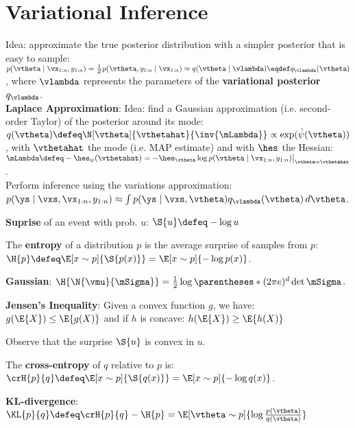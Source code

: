 \section{Variational Inference}
Idea: approximate the true posterior distribution with a simpler posterior that is easy to sample: \\$p(\vtheta \mid \vx_{1:n}, y_{1:n}) = \frac{1}{Z} p(\vtheta, y_{1:n} \mid \vx_{1:n}) \approx q(\vtheta \mid \vlambda) \eqdef q_\vlambda(\vtheta)$, where $\vlambda$ represents the parameters of the \textbf{variational posterior} $q_\vlambda$.\\
\textbf{Laplace Approximation}: Idea: find a Gaussian approximation (i.e. second-order Taylor) of the posterior around its mode:
$q(\vtheta) \defeq \N[\vtheta]{\vthetahat}{\inv{\mLambda}} \propto \exp(\hat{\psi}(\vtheta))$, with $\vthetahat$ the mode (i.e. MAP estimate) and with $\hes$ the Hessian: $\mLambda \defeq - \hes_\psi(\vthetahat) = - \hes_\vtheta \log p(\vtheta \mid \vx_{1:n}, y_{1:n}) \bigl|_{\vtheta = \vthetahat}$. \\
Perform inference using the variations approximation: $p(\ys \mid \vxs, \vx_{1:n}, y_{1:n})  \approx \int p(\ys \mid \vxs, \vtheta) q_\vlambda(\vtheta) \,d\vtheta$.
\begin{framed}
    \textbf{Suprise} of an event with prob. $u$: $\S{u} \defeq - \log u$
\end{framed}
\begin{framed}
    The \textbf{entropy} of a distribution $p$ is the average surprise of samples from $p$:\\
    $\H{p} \defeq \E[x \sim p]{\S{p(x)}} = \E[x \sim p]{- \log p(x)}$.
\end{framed}
\textbf{Gaussian}: $\H{\N{\vmu}{\mSigma}} = \frac{1}{2} \log \parentheses*{(2 \pi e)^d \det{\mSigma}}$.
\begin{framed}
    \textbf{Jensen's Inequality}: Given a convex function $g$, we have:
    $g(\E{X}) \leq \E{g(X)}$ and if $h$ is concave:  $h(\E{X}) \geq \E{h(X)}$
\end{framed}
Observe that the surprise $\S{u}$ is convex in $u$.
\begin{framed}
    The \textbf{cross-entropy} of $q$ relative to $p$ is: \\
    $\crH{p}{q} \defeq \E[x \sim p]{\S{q(x)}} = \E[x \sim p]{- \log q(x)}$.
\end{framed}
\begin{framed}
    \textbf{KL-divergence}: \\
    $\KL{p}{q} \defeq \crH{p}{q} - \H{p} = \E[\vtheta \sim p]{\log \frac{p(\vtheta)}{q(\vtheta)}}$
\end{framed}
